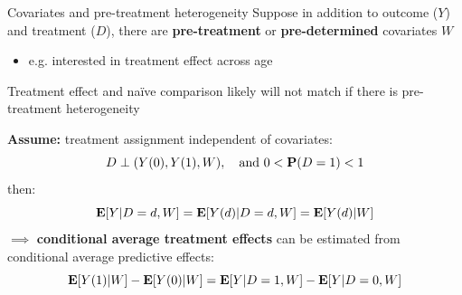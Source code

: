 \documentclass[compress, 8pt]{beamer}
\begin{document}
\begin{frame}{Covariates and pre-treatment heterogeneity}
    Suppose in addition to outcome ($Y$) and treatment ($D$), there are \textbf{pre-treatment} or \textbf{pre-determined} covariates $W$
    \begin{itemize}
        \item e.g. interested in treatment effect across age
    \end{itemize}

    \vspace{2ex}
    Treatment effect and na{\"i}ve comparison likely will not match if there is pre-treatment heterogeneity
    
    \vspace{2ex}
    \textbf{Assume:} treatment assignment independent of covariates: 
    \begin{equation*}
        D \perp (Y(0), Y(1), W), \quad\text{and} \ 0 < \mathbf{P}(D = 1) < 1
    \end{equation*}
    then:
    \begin{equation*}
        \mathbf{E} [Y \vert D = d, W] = \mathbf{E} [Y(d) \vert D = d, W] = \mathbf{E} [Y (d) \vert W]
    \end{equation*}
    $\implies$ \textbf{conditional average treatment effects} can be estimated from conditional average predictive effects:
    \begin{equation*}
        \mathbf{E} [Y(1) \vert W] - \mathbf{E} [Y(0) \vert W] = \mathbf{E}[Y \vert D=1, W] - \mathbf{E} [Y \vert D=0, W]
    \end{equation*}
\end{frame}




\end{document}
